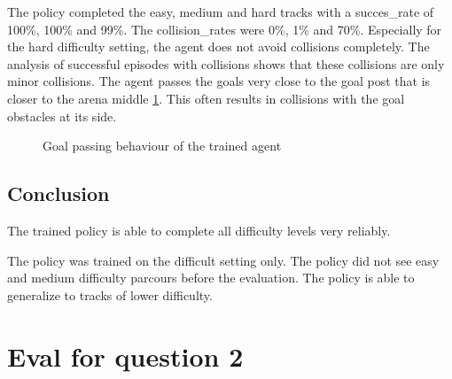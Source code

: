 The policy completed the easy, medium and hard tracks with a succes\_rate of 100\%, 100\% and 99\%. 
The collision\_rates were 0\%, 1\% and  70\%. Especially for the hard difficulty setting, the agent does not avoid collisions completely. The analysis of successful episodes with collisions shows that these collisions are only minor collisions. The agent passes the goals very close to the goal post that is closer to the arena middle \ref{fig:agent_behaviour}. This often results in collisions with the goal obstacles at its side.

\begin{figure}
    \centering
    \caption{Goal passing behaviour of the trained agent}
    \label{fig:agent_behaviour}
\end{figure}


\subsection{Conclusion}

The trained policy is able to complete all difficulty levels very reliably.

The policy was trained on the difficult setting only. The policy did not see easy and medium difficulty parcours before the evaluation. The policy is able to generalize to tracks of lower difficulty.

\section{Eval for question 2}

